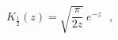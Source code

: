 \begin{equation}
{\mathit {K}}_{\frac {1}{2}}(z) = \sqrt {\frac {\pi}{2z} }~e^{-z} ~~~,
\end{equation} 
